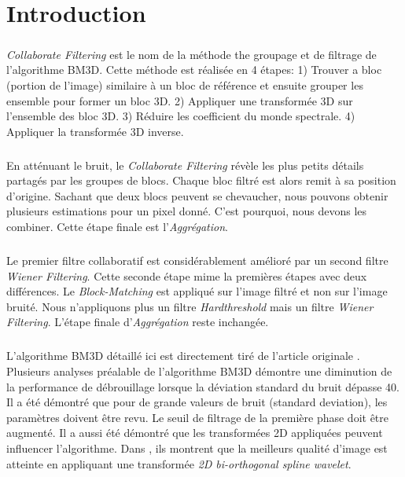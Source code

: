 
\chapter{Introduction}
\paragraph{}
\textit{Collaborate Filtering} est le nom de la méthode the groupage et de filtrage de l'algorithme BM3D. Cette méthode est réalisée en 4 étapes: 1) Trouver a bloc (portion de l'image) similaire à un bloc de référence et ensuite grouper les ensemble pour former un bloc 3D. 2) Appliquer une transformée 3D sur l'ensemble des bloc 3D. 3) Réduire les coefficient du monde spectrale. 4) Appliquer la transformée 3D inverse. 
\paragraph{}
En atténuant le bruit, le \textit{Collaborate Filtering} révèle les plus petits détails partagés par les groupes de blocs. Chaque bloc filtré est alors remit à sa position d'origine. Sachant que deux blocs peuvent se chevaucher, nous pouvons obtenir plusieurs estimations pour un pixel donné. C'est pourquoi, nous devons les combiner. Cette étape finale est l'\textit{Aggrégation}.
\paragraph{}
Le premier filtre collaboratif est considérablement amélioré par un second filtre \textit{Wiener Filtering}. Cette seconde étape mime la premières étapes avec deux différences. Le \textit{Block-Matching} est appliqué sur l'image filtré et non sur l'image bruité. Nous n'appliquons plus un filtre \textit{Hardthreshold} mais un filtre \textit{Wiener Filtering}. L'étape finale d'\textit{Aggrégation} reste inchangée.
\paragraph{}
L'algorithme BM3D détaillé ici est directement tiré de l'article originale \cite{1}. Plusieurs analyses préalable de l'algorithme BM3D démontre une diminution de la performance de débrouillage lorsque la déviation standard du bruit dépasse 40. Il a été démontré que pour de grande valeurs de bruit (standard deviation), les paramètres doivent être revu. Le seuil de filtrage de la première phase doit être augmenté. Il a aussi été démontré que les transformées 2D appliquées peuvent influencer l'algorithme. Dans \cite{2}, ils montrent que la meilleurs qualité d'image est atteinte en appliquant une transformée \textit{2D bi-orthogonal spline wavelet}. 
